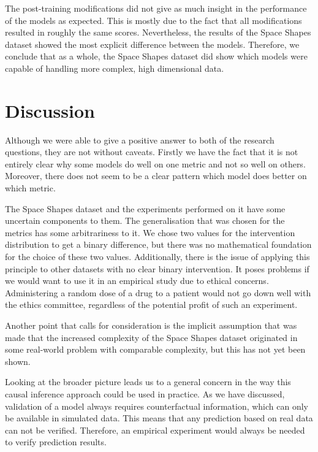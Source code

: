 \documentclass{report}
\begin{document}
The post-training modifications did not give as much insight in the performance of the models as expected. This is mostly due to the fact that all modifications resulted in roughly the same scores. Nevertheless, the results of the Space Shapes dataset showed the most explicit difference between the models. Therefore, we conclude that as a whole, the Space Shapes dataset did show which models were capable of handling more complex, high dimensional data.

\section{Discussion}
Although we were able to give a positive answer to both of the research questions, they are not without caveats. Firstly we have the fact that it is not entirely clear why some models do well on one metric and not so well on others. Moreover, there does not seem to be a clear pattern which model does better on which metric.


The Space Shapes dataset and the experiments performed on it have some uncertain components to them. The generalisation that was chosen for the metrics has some arbitrariness to it. We chose two values for the intervention distribution to get a binary difference, but there was no mathematical foundation for the choice of these two values. Additionally, there is the issue of applying this principle to other datasets with no clear binary intervention. It poses problems if we would want to use it in an empirical study due to ethical concerns. Administering a random dose of a drug to a patient would not go down well with the ethics committee, regardless of the potential profit of such an experiment.

Another point that calls for consideration is the implicit assumption that was made that the increased complexity of the Space Shapes dataset originated in some real-world problem with comparable complexity, but this has not yet been shown.





Looking at the broader picture leads us to a general concern in the way this causal inference approach could be used in practice. As we have discussed, validation of a model always requires counterfactual information, which can only be available in simulated data. This means that any prediction based on real data can not be verified. Therefore, an empirical experiment would always be needed to verify prediction results.
\end{document}
